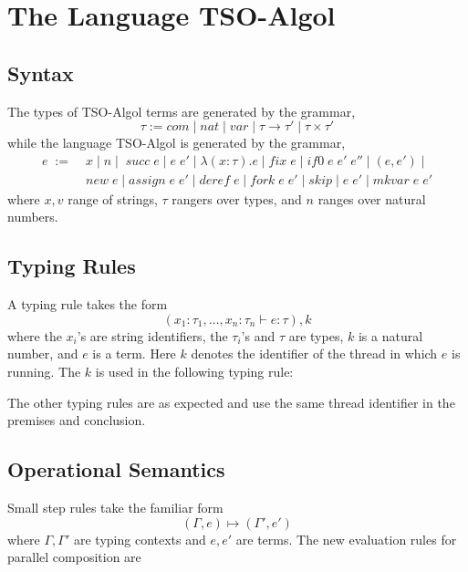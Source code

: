 \documentclass{article}
\begin{document}
\section{The Language TSO-Algol}
\subsection{Syntax}
The types of TSO-Algol terms are generated by the grammar,
$$\tau := com \; | \; nat \; | \; var \; | \; \tau \rightarrow \tau' \; | \;
\tau \times \tau'$$ 
while the language TSO-Algol is generated by the grammar,
\begin{align*}
e \; := \; &x \; | \; n \; | \; \; succ \; e \; | \; e \; e' \; | \;
\lambda (x:\tau).e \; | \; fix \; e \; | \; if0 \; e \; e' \; e'' \; | \; (e,
e') \; | \\
&new \; e \; | \; assign \; e \; e' \; | \; deref \; e \; |
\; fork \; e \; e' \; | \; skip \; | \; e \; e' \; | \; mkvar \; e \; e'
\end{align*}
where $x,v$ range of strings, $\tau$ rangers over types, and $n$ ranges over
natural numbers.
\subsection{Typing Rules}
A typing rule takes the form 
$$(x_1 : \tau_1, \ldots, x_n:\tau_n \vdash e : \tau), k$$
where the $x_i$'s are string identifiers, the $\tau_i$'s and $\tau$ are types,
$k$ is a natural number, and $e$ is a term. Here $k$ denotes the identifier of
the thread in which $e$ is running. The $k$ is used in the following typing
rule:
\begin{prooftree}
\end{prooftree}
The other typing rules are as expected and use the same thread identifier in the
premises and conclusion.
\subsection{Operational Semantics}
Small step rules take the familiar form
$$(\Gamma, e) \mapsto (\Gamma', e')$$
where $\Gamma, \Gamma'$ are typing contexts and $e, e'$ are terms. The new
evaluation rules for parallel composition are
\begin{prooftree}
\end{prooftree}
\begin{prooftree}
\end{prooftree}
\begin{prooftree}
\end{prooftree}
\end{document}
